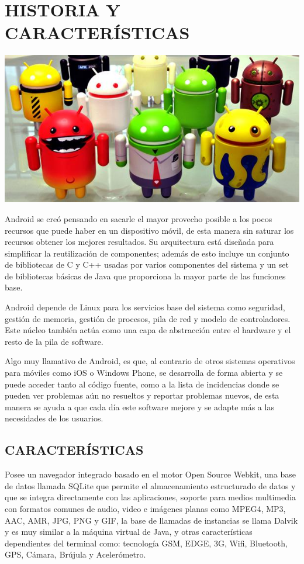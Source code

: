 \section*{HISTORIA Y CARACTERÍSTICAS}
\includegraphics[scale=0.5]{img/cp05/img0503.png}

Android se creó pensando en sacarle el mayor provecho posible a los pocos recursos que puede haber en un dispositivo móvil, de esta manera sin saturar los recursos obtener los 
mejores resultados. Su arquitectura está diseñada para simplificar la reutilización de componentes; además de esto incluye un conjunto de bibliotecas de C y C++ usadas por varios 
componentes del sistema y un set de bibliotecas básicas de Java que proporciona la mayor parte de las funciones base.

Android depende de Linux para los servicios base del sistema como seguridad, gestión de memoria, gestión de procesos, pila de red y modelo de controladores. Este núcleo también 
actúa como una capa de abstracción entre el hardware y el resto de la pila de software.

Algo muy llamativo de Android, es que, al contrario de otros sistemas operativos para móviles como iOS o Windows Phone, se desarrolla de forma abierta y se puede acceder tanto al 
código fuente, como a la lista de incidencias donde se pueden ver problemas aún no resueltos y reportar problemas nuevos, de esta manera se ayuda a que cada día este software 
mejore y se adapte más a las necesidades de los usuarios.

\subsection*{CARACTERÍSTICAS}
Posee un navegador integrado basado en el motor Open Source Webkit, una base de datos llamada SQLite que permite el almacenamiento estructurado de datos y que se integra 
directamente con las aplicaciones, soporte para medios multimedia con formatos comunes de audio, video e imágenes planas como MPEG4, MP3, AAC, AMR, JPG, PNG y GIF, la base de 
llamadas de instancias se llama Dalvik y es muy similar a la máquina virtual de Java, y otras características dependientes del terminal como: tecnología GSM, EDGE, 3G, Wifi, 
Bluetooth, GPS, Cámara, Brújula y Acelerómetro.

